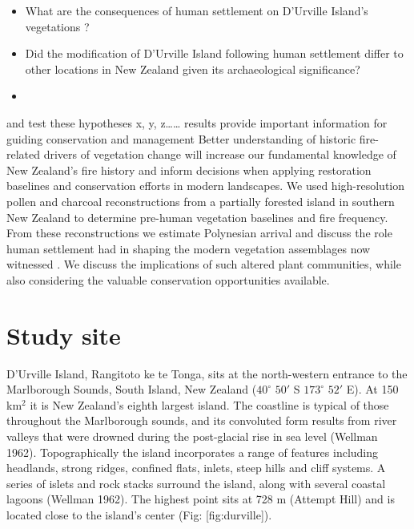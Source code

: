 \begin{itemize}
\item
  What are the consequences of human settlement on D'Urville Island's
  vegetations ?
\item
  Did the modification of D'Urville Island following human settlement
  differ to other locations in New Zealand given its archaeological
  significance?
\item
\end{itemize}

and test these hypotheses x, y, z\ldots{}\ldots{} results provide
important information for guiding conservation and management Better
understanding of historic fire-related drivers of vegetation change will
increase our fundamental knowledge of New Zealand's fire history and
inform decisions when applying restoration baselines and conservation
efforts in modern landscapes. We used high-resolution pollen and
charcoal reconstructions from a partially forested island in southern
New Zealand to determine pre-human vegetation baselines and fire
frequency. From these reconstructions we estimate Polynesian arrival and
discuss the role human settlement had in shaping the modern vegetation
assemblages now witnessed . We discuss the implications of such altered
plant communities, while also considering the valuable conservation
opportunities available.

\section{Study site}\label{study-site}

D'Urville Island, Rangitoto ke te Tonga, sits at the north-western
entrance to the Marlborough Sounds, South Island, New Zealand
(\(40^\circ\) \(50'\) S \(173^\circ\) \(52'\) E). At 150 km\(^2\) it is
New Zealand's eighth largest island. The coastline is typical of those
throughout the Marlborough sounds, and its convoluted form results from
river valleys that were drowned during the post-glacial rise in sea
level (Wellman 1962). Topographically the island incorporates a range of
features including headlands, strong ridges, confined flats, inlets,
steep hills and cliff systems. A series of islets and rock stacks
surround the island, along with several coastal lagoons (Wellman 1962).
The highest point sits at 728 m (Attempt Hill) and is located close to
the island's center (Fig: {[}fig:durville{]}).

